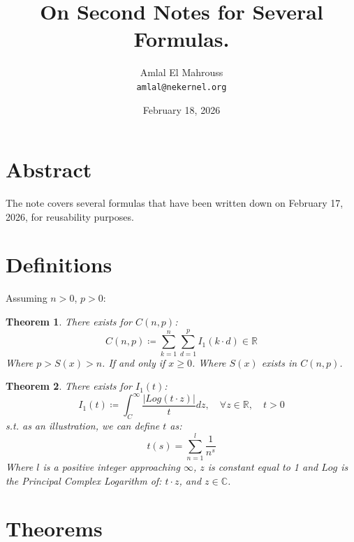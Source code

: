 \documentclass[11pt, a4paper]{article}
\title{On Second Notes for Several Formulas.}
\author{Amlal El Mahrouss\\\texttt{amlal@nekernel.org}}
\date{February 18, 2026}
\theoremstyle{plain}
\newtheorem{theorem}{Theorem}[section]
\theoremstyle{definition}
\theoremstyle{remark}
\begin{document}
\twocolumn[{%
  \maketitle
  \vspace{-0.5em}
  \vspace{0.8em}
  \rule{\linewidth}{0.4pt}
  \vspace{1em}
}]

\maketitle

\section{Abstract}
The note covers several formulas that have been written down on February 17, 2026, for reusability purposes.

\section{Definitions}
Assuming $n > 0$, $p > 0$:
\begin{theorem}
There exists for $C(n, p)$:
\begin{equation}
C(n, p) \coloneq \sum_{k=1}^{n} \sum_{d=1}^{p} I_{1} (k \cdot d) \in \mathbb{R}
\end{equation}
Where $p > S(x) > n$. If and only if $x \geq 0$. Where $S(x)$ exists in $C(n ,p)$.
\end{theorem}

\begin{theorem}
There exists for $I_{1}(t)$:
\begin{equation}
I_{1}(t) \coloneq \int_{C}^{\infty} \frac{|Log(t \cdot z)|}{t}dz, \quad \forall z \in \mathbb{R}, \quad t > 0
\end{equation}
s.t. as an illustration, we can define $t$ as:
\begin{equation}
t(s)=\sum_{n=1}^{l} \frac{1}{n^{s}}
\end{equation}
Where $l$ is a positive integer approaching $\infty$, $z$ is constant equal to 1 and $Log$ is the Principal Complex Logarithm of: $t \cdot z$, and $z \in \mathbb{C}$.
\end{theorem}

\section{Theorems}
\end{document}
